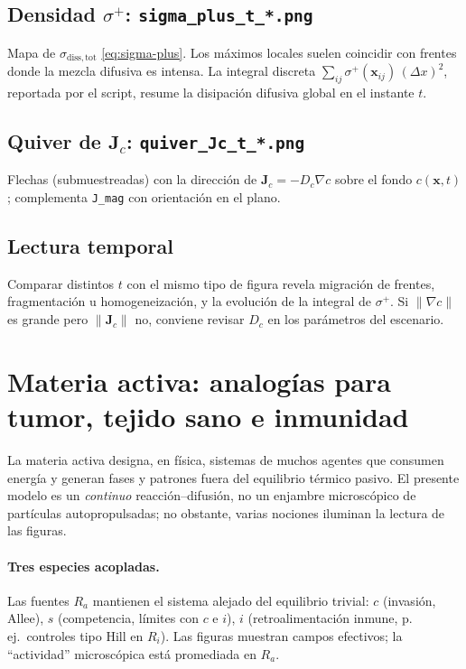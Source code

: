 \documentclass[11pt,a4paper]{article}
\newcommand{\vect}[1]{\mathbf{#1}}
\begin{document}
\subsection{Densidad $\sigma^{+}$: \texttt{sigma\_plus\_t\_*.png}}

Mapa de $\sigma_{\mathrm{diss,tot}}$ \eqref{eq:sigma-plus}. Los máximos locales
suelen coincidir con frentes donde la mezcla difusiva es intensa. La integral
discreta $\sum_{ij}\sigma^{+}(\vect{x}_{ij})\,(\Delta x)^2$, reportada por el
script, resume la disipación difusiva global en el instante $t$.

\subsection{Quiver de $\vect{J}_c$: \texttt{quiver\_Jc\_t\_*.png}}

Flechas (submuestreadas) con la dirección de $\vect{J}_c=-D_c\nabla c$ sobre el
fondo $c(\vect{x},t)$; complementa \texttt{J\_mag} con orientación en el plano.

\subsection{Lectura temporal}

Comparar distintos $t$ con el mismo tipo de figura revela migración de frentes,
fragmentación u homogeneización, y la evolución de la integral de $\sigma^{+}$.
Si $\lVert\nabla c\rVert$ es grande pero $\lVert\vect{J}_c\rVert$ no, conviene
revisar $D_c$ en los parámetros del escenario.

\section{Materia activa: analogías para tumor, tejido sano e inmunidad}

La materia activa designa, en física, sistemas de muchos agentes que consumen
energía y generan fases y patrones fuera del equilibrio térmico pasivo. El
presente modelo es un \emph{continuo} reacción--difusión, no un enjambre
microscópico de partículas autopropulsadas; no obstante, varias nociones
iluminan la lectura de las figuras.

\paragraph{Tres especies acopladas.}
Las fuentes $R_a$ mantienen el sistema alejado del equilibrio trivial: $c$
(invasión, Allee), $s$ (competencia, límites con $c$ e $i$), $i$ (retroalimentación
inmune, p.\,ej.\ controles tipo Hill en $R_i$). Las figuras muestran campos
efectivos; la ``actividad'' microscópica está promediada en $R_a$.
\end{document}
